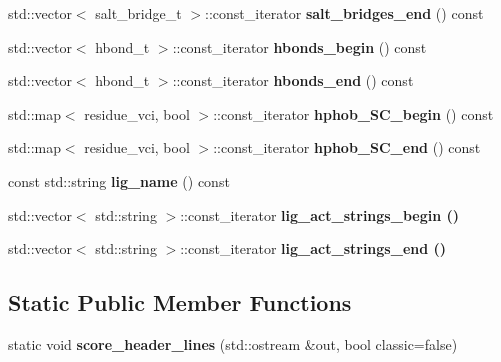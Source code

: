 \begin{CompactItemize}
\item 
std::vector$<$ salt\_\-bridge\_\-t $>$::const\_\-iterator \textbf{salt\_\-bridges\_\-end} () const \label{classASCbase_1_1ProtLigScore_ea289b8b558b201953876c8e9ed0f4a3}

\item 
std::vector$<$ hbond\_\-t $>$::const\_\-iterator \textbf{hbonds\_\-begin} () const \label{classASCbase_1_1ProtLigScore_52476c5b5fdeb1e03c06f92ab6be71e0}

\item 
std::vector$<$ hbond\_\-t $>$::const\_\-iterator \textbf{hbonds\_\-end} () const \label{classASCbase_1_1ProtLigScore_9c33162446d3ba3d1788878ffea98039}

\item 
std::map$<$ residue\_\-vci, bool $>$::const\_\-iterator \textbf{hphob\_\-SC\_\-begin} () const \label{classASCbase_1_1ProtLigScore_78531873dda937cd13058da1898dc9b9}

\item 
std::map$<$ residue\_\-vci, bool $>$::const\_\-iterator \textbf{hphob\_\-SC\_\-end} () const \label{classASCbase_1_1ProtLigScore_2450c044ac7c187dd0cf1a74fd3f15ad}

\item 
const std::string \textbf{lig\_\-name} () const \label{classASCbase_1_1ProtLigScore_c17dbe0c860a1d3f6b43c6e82eade318}

\item 
std::vector$<$ std::string $>$::const\_\-iterator \bf{lig\_\-act\_\-strings\_\-begin} ()
\item 
std::vector$<$ std::string $>$::const\_\-iterator \bf{lig\_\-act\_\-strings\_\-end} ()
\end{CompactItemize}
\subsection*{Static Public Member Functions}
\begin{CompactItemize}
\item 
static void \textbf{score\_\-header\_\-lines} (std::ostream \&out, bool classic=false)\label{classASCbase_1_1ProtLigScore_dc5ffb2f1b082529473e3ee6f2843ba8}

\end{CompactItemize}
